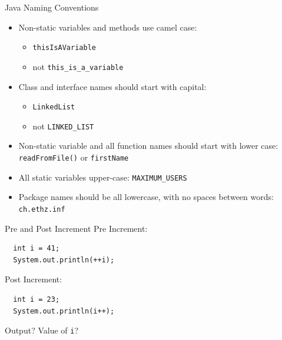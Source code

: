 \begin{frame}[fragile]{Java Naming Conventions}
  \begin{itemize}
  \item Non-static variables and methods use camel case:
    \begin{itemize}
    \item \lstinline!thisIsAVariable!
    \item \alert{not} \lstinline!this_is_a_variable!
    \end{itemize}
  \item Class and interface names should start with capital:
    \begin{itemize}
    \item \lstinline!LinkedList!
    \item \alert{not} \lstinline!LINKED_LIST!
    \end{itemize}
  \item Non-static variable and all function names should start with
    lower case: \lstinline!readFromFile()! or \lstinline!firstName!
  \item All static variables upper-case: \lstinline!MAXIMUM_USERS!
  \item Package names should be all lowercase, with no spaces between
    words: \lstinline!ch.ethz.inf!
  \end{itemize}
\end{frame}

\begin{frame}[fragile]{Pre and Post Increment}
  Pre Increment:


  \begin{lstlisting}
  int i = 41;
  System.out.println(++i);    
  \end{lstlisting}


  Post Increment:


  \begin{lstlisting}
  int i = 23;
  System.out.println(i++);    
  \end{lstlisting}


  Output? Value of \lstinline!i!?
\end{frame}


